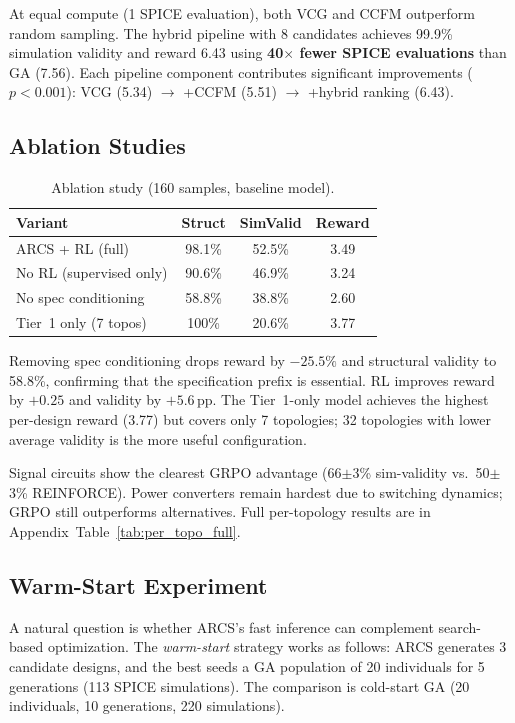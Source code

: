 \documentclass[conference]{IEEEtran}
\begin{document}
At equal compute (1 SPICE evaluation), both VCG and CCFM outperform
random sampling. The hybrid pipeline with 8 candidates achieves 99.9\%
simulation validity and reward 6.43 using \textbf{40$\times$ fewer
SPICE evaluations} than GA (7.56). Each pipeline component contributes
significant improvements ($p < 0.001$): VCG (5.34) $\rightarrow$
+CCFM (5.51) $\rightarrow$ +hybrid ranking (6.43).

\subsection{Ablation Studies}

\begin{table}[t]
\centering
\caption{Ablation study (160 samples, baseline model).}
\label{tab:ablation}
\begin{tabular}{@{}lccc@{}}
\toprule
Variant & Struct & SimValid & Reward \\
\midrule
ARCS + RL (full)       & 98.1\% & 52.5\% & 3.49 \\
No RL (supervised only) & 90.6\% & 46.9\% & 3.24 \\
No spec conditioning   & 58.8\% & 38.8\% & 2.60 \\
Tier~1 only (7 topos)  & 100\%  & 20.6\% & 3.77 \\
\bottomrule
\end{tabular}
\end{table}

Removing spec conditioning drops reward by $-25.5\%$ and structural
validity to 58.8\%, confirming that the specification prefix is
essential. RL improves reward by $+0.25$ and validity by $+5.6$\,pp.
The Tier~1-only model achieves the highest per-design reward (3.77) but
covers only 7 topologies; 32 topologies with lower average validity is
the more useful configuration.

Signal circuits show the clearest GRPO advantage
(66$\pm$3\% sim-validity vs.\ 50$\pm$3\% REINFORCE). Power converters
remain hardest due to switching dynamics; GRPO still outperforms
alternatives. Full per-topology results are in
Appendix~Table~\ref{tab:per_topo_full}.

\subsection{Warm-Start Experiment}
\label{sec:warm-start}

A natural question is whether ARCS's fast inference can complement
search-based optimization. The \emph{warm-start} strategy works as follows:
ARCS generates 3 candidate designs, and the best seeds a GA population
of 20 individuals for 5 generations (113 SPICE simulations). The comparison
is cold-start GA (20 individuals, 10 generations, 220 simulations).
\end{document}

